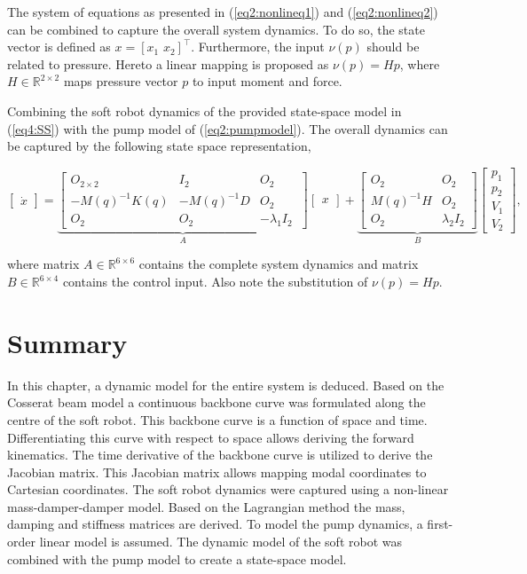 The system of equations as presented in (\ref{eq2:nonlineq1}) and (\ref{eq2:nonlineq2}) can be combined to capture the overall system dynamics. To do so, the state vector is defined as $x = [x_1 \hspace{4pt} x_2]^\top$. Furthermore, the input $\nu(p)$ should be related to pressure. Hereto a linear mapping is proposed as $\nu(p) = H p$, where $H \in \mathbb{R}^{2\times 2}$ maps pressure vector $p$ to input moment and force. 

Combining the soft robot dynamics of the provided state-space model in (\ref{eq4:SS}) with the pump model of (\ref{eq2:pumpmodel}). The overall dynamics can be captured by the following state space representation,

\begin{equation}
     \begin{bmatrix} \dot{x}  \end{bmatrix}   =   \underbrace{ \begin{bmatrix} O_{2\times 2} & I_{2} & O_{2} \\ -M(q)^{-1}K(q)  & -M(q)^{-1} D & O_{2} \\
     O_{2} & O_{2}    & -\lambda_1 I_{2}\ \end{bmatrix}   }_A   \begin{bmatrix} x \end{bmatrix}  + \underbrace{      \begin{bmatrix} O_{2} & O_{2} \\ M(q)^{-1}H & O_{2} \\ O_{2} & \lambda_2 I_{2} \end{bmatrix} }_B      \begin{bmatrix} p_1 \\ p_2  \\ V_1 \\ V_2 \end{bmatrix},
     \label{eq:ssp}
\end{equation}

where matrix $A \in \mathbb{R}^{6\times 6}$ contains the complete system dynamics and matrix $B \in \mathbb{R}^{6\times 4}$ contains the control input. Also note the substitution of $\nu(p) = Hp$.



\section*{Summary}

In this chapter, a dynamic model for the entire system is deduced. Based on the Cosserat beam model a continuous backbone curve was formulated along the centre of the soft robot. This backbone curve is a function of space and time. Differentiating this curve with respect to space allows deriving the forward kinematics. The time derivative of the backbone curve is utilized to derive the Jacobian matrix. This Jacobian matrix allows mapping modal coordinates to Cartesian coordinates. The soft robot dynamics were captured using a non-linear mass-damper-damper model. Based on the Lagrangian method the mass, damping and stiffness matrices are derived. To model the pump dynamics, a first-order linear model is assumed. The dynamic model of the soft robot was combined with the pump model to create a state-space model. 
